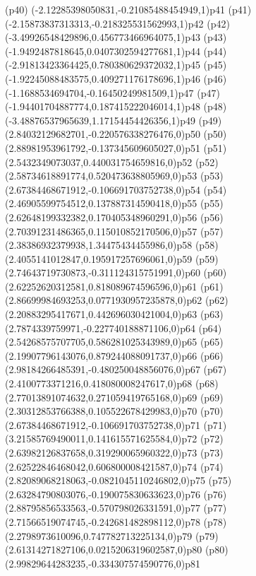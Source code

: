 \psdot(p40)
\psPoint(-2.12285398050831,-0.21085488454949,1){p41}
\psdot(p41)
\psPoint(-2.15873837313313,-0.218325531562993,1){p42}
\psdot(p42)
\psPoint(-3.49926548429896,0.456773466964075,1){p43}
\psdot(p43)
\psPoint(-1.9492487818645,0.0407302594277681,1){p44}
\psdot(p44)
\psPoint(-2.91813423364425,0.780380629372032,1){p45}
\psdot(p45)
\psPoint(-1.92245088483575,0.409271176178696,1){p46}
\psdot(p46)
\psPoint(-1.1688534694704,-0.16450249981509,1){p47}
\psdot(p47)
\psPoint(-1.94401704887774,0.187415222046014,1){p48}
\psdot(p48)
\psPoint(-3.48876537965639,1.17154454426356,1){p49}
\psdot(p49)
\psPoint(2.84032129682701,-0.220576338276476,0){p50}
\psdot(p50)
\psPoint(2.88981953961792,-0.137345609605027,0){p51}
\psdot(p51)
\psPoint(2.5432349073037,0.440031754659816,0){p52}
\psdot(p52)
\psPoint(2.58734618891774,0.520473638805969,0){p53}
\psdot(p53)
\psPoint(2.67384468671912,-0.106691703752738,0){p54}
\psdot(p54)
\psPoint(2.46905599754512,0.137887314590418,0){p55}
\psdot(p55)
\psPoint(2.62648199332382,0.170405348960291,0){p56}
\psdot(p56)
\psPoint(2.70391231486365,0.115010852170506,0){p57}
\psdot(p57)
\psPoint(2.38386932379938,1.34475434455986,0){p58}
\psdot(p58)
\psPoint(2.4055141012847,0.195917257696061,0){p59}
\psdot(p59)
\psPoint(2.74643719730873,-0.311124315751991,0){p60}
\psdot(p60)
\psPoint(2.62252620312581,0.818089674596596,0){p61}
\psdot(p61)
\psPoint(2.86699984693253,0.0771930957235878,0){p62}
\psdot(p62)
\psPoint(2.20883295417671,0.442696030421004,0){p63}
\psdot(p63)
\psPoint(2.7874339759971,-0.227740188871106,0){p64}
\psdot(p64)
\psPoint(2.54268575707705,0.586281025343989,0){p65}
\psdot(p65)
\psPoint(2.19907796143076,0.879244088091737,0){p66}
\psdot(p66)
\psPoint(2.98184266485391,-0.480250048856076,0){p67}
\psdot(p67)
\psPoint(2.4100773371216,0.418080008247617,0){p68}
\psdot(p68)
\psPoint(2.77013891074632,0.271059419765168,0){p69}
\psdot(p69)
\psPoint(2.30312853766388,0.105522678429983,0){p70}
\psdot(p70)
\psPoint(2.67384468671912,-0.106691703752738,0){p71}
\psdot(p71)
\psPoint(3.21585769490011,0.141615571625584,0){p72}
\psdot(p72)
\psPoint(2.63982126837658,0.319290065960322,0){p73}
\psdot(p73)
\psPoint(2.62522846468042,0.606800008421587,0){p74}
\psdot(p74)
\psPoint(2.82089068218063,-0.0821045110246802,0){p75}
\psdot(p75)
\psPoint(2.63284790803076,-0.190075830633623,0){p76}
\psdot(p76)
\psPoint(2.88795856533563,-0.570798026331591,0){p77}
\psdot(p77)
\psPoint(2.71566519074745,-0.242681482898112,0){p78}
\psdot(p78)
\psPoint(2.2798973610096,0.747782713225134,0){p79}
\psdot(p79)
\psPoint(2.61314271827106,0.0215206319602587,0){p80}
\psdot(p80)
\psPoint(2.99829644283235,-0.334307574590776,0){p81}
